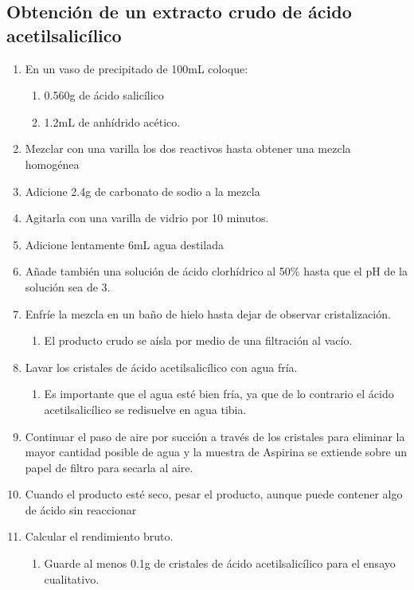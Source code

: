 \subsection{Obtención de un extracto crudo de ácido acetilsalicílico}
\begin{enumerate}
    \item En un vaso de precipitado de 100mL coloque:
    \begin{enumerate}
        \item 0.560g de ácido salicílico
        \item 1.2mL de anhídrido acético.
    \end{enumerate}
    
    \item Mezclar con una varilla los dos reactivos hasta obtener una mezcla homogénea
    \item Adicione 2.4g de carbonato de sodio a la mezcla
    \item Agitarla con una varilla de vidrio por 10 minutos.
    \item Adicione lentamente 6mL agua destilada
    \item Añade también una solución de ácido clorhídrico al 50\% hasta que el pH de la solución sea de 3.
    \item Enfríe la mezcla en un baño de hielo hasta dejar de observar cristalización.
    \begin{enumerate}
        \item El producto crudo se aísla por medio de una filtración al vacío.
    \end{enumerate}
    
    \item Lavar los cristales de ácido acetilsalicílico con agua fría.
    \begin{enumerate}
        \item Es importante que el agua esté bien fría, ya que de lo contrario el ácido acetilsalicílico se redisuelve en agua tibia.
    \end{enumerate}
    
    \item Continuar el paso de aire por succión a través de los cristales para eliminar la mayor cantidad posible de agua y la muestra de Aspirina se extiende sobre un papel de filtro para secarla al aire.
    \item Cuando el producto esté seco, pesar el producto, aunque puede contener algo de ácido sin reaccionar
    \item Calcular el rendimiento bruto.
    \begin{enumerate}
        \item Guarde al menos 0.1g de cristales de ácido acetilsalicílico para el ensayo cualitativo.
    \end{enumerate}
    
\end{enumerate}

